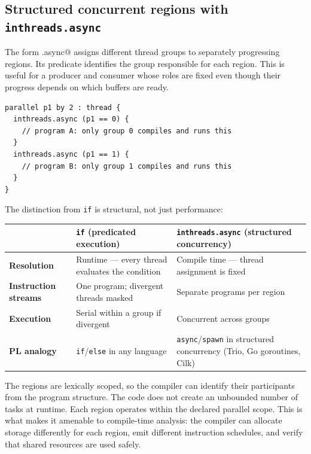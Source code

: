 \subsection*{Structured concurrent regions with \texttt{inthreads.\allowbreak{}async}}

The form \co@inthreads.async@ assigns different thread groups to separately progressing regions. Its predicate identifies the group responsible for each region. This is useful for a producer and consumer whose roles are fixed even though their progress depends on which buffers are ready.

\begin{lstlisting}[language=croqtile,caption={Structured concurrent regions with inthreads.async}]
parallel p1 by 2 : thread {
  inthreads.async (p1 == 0) {
    // program A: only group 0 compiles and runs this
  }
  inthreads.async (p1 == 1) {
    // program B: only group 1 compiles and runs this
  }
}
\end{lstlisting}

The distinction from \texttt{if} is structural, not just performance:

\begin{table}[htbp]
\centering\small
\begin{tabularx}{\linewidth}{@{}lXX@{}}
\toprule
 & \textbf{\texttt{if} (predicated execution)} & \textbf{\texttt{inthreads.\allowbreak{}async} (structured concurrency)} \\
\midrule
\textbf{Resolution} & Runtime --- every thread evaluates the condition & Compile time --- thread assignment is fixed \\
\textbf{Instruction streams} & One program; divergent threads masked & Separate programs per region \\
\textbf{Execution} & Serial within a group if divergent & Concurrent across groups \\
\textbf{PL analogy} & \texttt{if}/\texttt{else} in any language & \texttt{async}/\texttt{spawn} in structured concurrency (Trio, Go goroutines, Cilk) \\
\bottomrule
\end{tabularx}
\end{table}

The regions are lexically scoped, so the compiler can identify their participants from the program structure. The code does not create an unbounded number of tasks at runtime. Each region operates within the declared parallel scope. This is what makes it amenable to compile-time analysis: the compiler can allocate storage differently for each region, emit different instruction schedules, and verify that shared resources are used safely.


